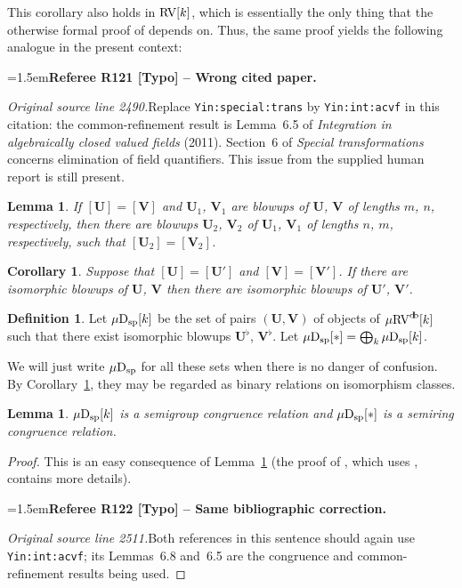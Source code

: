 \documentclass[12pt]{amsart}
\newcommand{\RefereeRemark}[4]{%
  \par\medskip\begingroup\normalfont\small\color{RefereePurple}%
  \emergencystretch=1.5em\noindent\textbf{Referee R#1 [#2] -- #3.}\par\nobreak\noindent #4\par
  \endgroup\medskip
}
\theoremstyle{plain}
\newtheorem{cor}[thm]{Corollary}
\newtheorem{lem}[thm]{Lemma}
\theoremstyle{definition}
\newtheorem{defn}[thm]{Definition}
\theoremstyle{remark}
\numberwithin{equation}{section}
\theoremstyle{plain}
\newcommand{\RV}{\textup{RV}}
\newcommand{\0}{\emptyset}
\newcommand{\mRV}{{\mu}{\RV}}
\newcommand{\dsp}{\textup{D}_{\textup{sp}}}
\newcommand{\mispdb}{\mu \dsp}
\DeclareMathOperator{\db}{d \! b}
\begin{document}
This corollary also holds in $\RV[k]$, which is essentially the only thing that the otherwise formal proof of \cite[Lemma~6.5]{Yin:special:trans} depends on. Thus, the same proof yields the following analogue in the present context:

\RefereeRemark{121}{Typo}{Wrong cited paper}{%
\textit{Original source line 2490.}\quad Replace \texttt{Yin:special:trans} by \texttt{Yin:int:acvf} in this citation: the common-refinement result is Lemma~6.5 of \emph{Integration in algebraically closed valued fields} (2011). Section~6 of \emph{Special transformations} concerns elimination of field quantifiers. This issue from the supplied human report is still present.
}

\begin{lem}\label{blowup:equi:class:coa}
If $[\bm U] = [\bm V]$ and $\bm U_1$, $\bm V_1$ are blowups of $\bm U$, $\bm V$ of lengths $m$, $n$, respectively, then there are blowups $\bm U_2$, $\bm V_2$ of $\bm U_1$, $\bm V_1$ of lengths $n$, $m$, respectively, such that $[\bm U_2] = [\bm V_2]$.
\end{lem}

\begin{cor}\label{blowup:equi:class}
Suppose that $[\bm U] = [\bm U']$ and $[\bm V] = [\bm V']$. If there are isomorphic blowups of $\bm U$, $\bm V$ then there are isomorphic blowups of $\bm U'$, $\bm V'$.
\end{cor}

\begin{defn}
Let $\mispdb[k]$ be the set of pairs $(\bm U, \bm V)$ of objects of $\mRV^{\db}[k]$ such that there exist isomorphic blowups $\bm U^{\flat}$, $\bm V^{\flat}$. Let $\mispdb[*] = \bigoplus_{k} \mispdb[k]$.
\end{defn}

We will just write $\mispdb$ for all these sets when there is no danger of confusion. By Corollary~\ref{blowup:equi:class}, they may be regarded as binary relations on isomorphism classes.


\begin{lem}\label{isp:congruence:vol}
$\mispdb[k]$ is a semigroup congruence relation and $\mispdb[*]$ is a semiring congruence relation.
\end{lem}
\begin{proof}
This is an easy consequence of Lemma~\ref{blowup:equi:class:coa} (the proof of \cite[Lemma~6.8]{Yin:special:trans}, which uses \cite[Lemma~6.5]{Yin:special:trans}, contains more details).

\RefereeRemark{122}{Typo}{Same bibliographic correction}{%
\textit{Original source line 2511.}\quad Both references in this sentence should again use \texttt{Yin:int:acvf}; its Lemmas~6.8 and~6.5 are the congruence and common-refinement results being used.
}
\end{proof}
\end{document}
